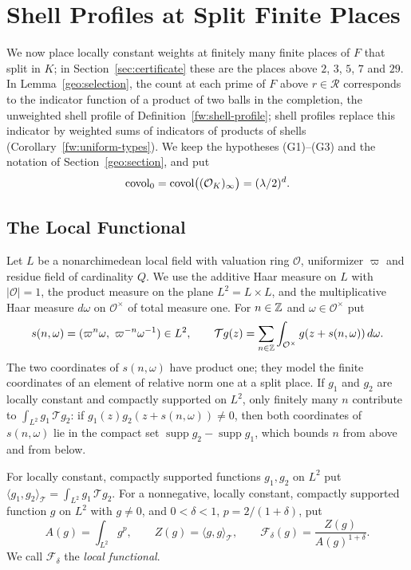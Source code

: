 \section{Shell Profiles at Split Finite Places}
\label{fw:section}

We now place locally constant weights at finitely many finite places of
$F$ that split in $K$; in Section~\ref{sec:certificate} these are the
places above $2$, $3$, $5$, $7$ and $29$. In
Lemma~\ref{geo:selection}, the count at each prime of $F$ above
$r\in\mathcal R$ corresponds to the indicator function of a product of
two balls in the completion, the unweighted shell profile of
Definition~\ref{fw:shell-profile}; shell profiles replace this indicator
by weighted sums of indicators of products of shells
(Corollary~\ref{fw:uniform-types}). We keep the hypotheses (G1)--(G3)
and the notation of Section~\ref{geo:section}, and put
\[
 \operatorname{covol}_0=\operatorname{covol}\bigl((\mathcal O_K)_\infty\bigr)=(\lambda/2)^d .
\]

\subsection{The Local Functional}

Let $L$ be a nonarchimedean local field with valuation ring $\mathcal
O$, uniformizer $\varpi$ and residue field of cardinality $Q$. We use
the additive Haar measure on $L$ with $|\mathcal O|=1$, the product
measure on the plane $L^2=L\times L$, and the multiplicative Haar
measure $d\omega$ on $\mathcal O^\times$ of total measure one. For $n\in\mathbb Z$
and $\omega\in\mathcal O^\times$ put
\[
 s(n,\omega)=(\varpi^n\omega,\ \varpi^{-n}\omega^{-1})\in L^2,\qquad
 \mathcal Tg(z)=\sum_{n\in\Z}\int_{\mathcal O^\times}g(z+s(n,\omega))\,d\omega .
\]
The two coordinates of $s(n,\omega)$ have product one; they model the
finite coordinates of an element of relative norm one at a split place.
If $g_1$ and $g_2$ are locally constant and compactly supported on
$L^2$, only finitely many $n$ contribute to $\int_{L^2}g_1\,\mathcal
Tg_2$: if $g_1(z)g_2(z+s(n,\omega))\ne0$, then both coordinates of
$s(n,\omega)$ lie in the compact set
$\operatorname{supp}g_2-\operatorname{supp}g_1$, which bounds $n$ from
above and from below.

\begin{definition}\label{fw:local-functional}
For locally constant, compactly supported functions $g_1,g_2$ on $L^2$
put $\langle g_1,g_2\rangle_{\mathcal T}=\int_{L^2}g_1\,\mathcal Tg_2$.
For a nonnegative, locally constant, compactly supported function $g$
on $L^2$ with $g\ne0$, and $0<\delta<1$, $p=2/(1+\delta)$, put
\begin{equation}\label{fw:functional}
 A(g)=\int_{L^2}g^p,\qquad Z(g)=\langle g,g\rangle_{\mathcal T},\qquad
 \mathcal F_\delta(g)=\frac{Z(g)}{A(g)^{1+\delta}} .
\end{equation}
We call $\mathcal F_\delta$ the \emph{local functional}.
\end{definition}

